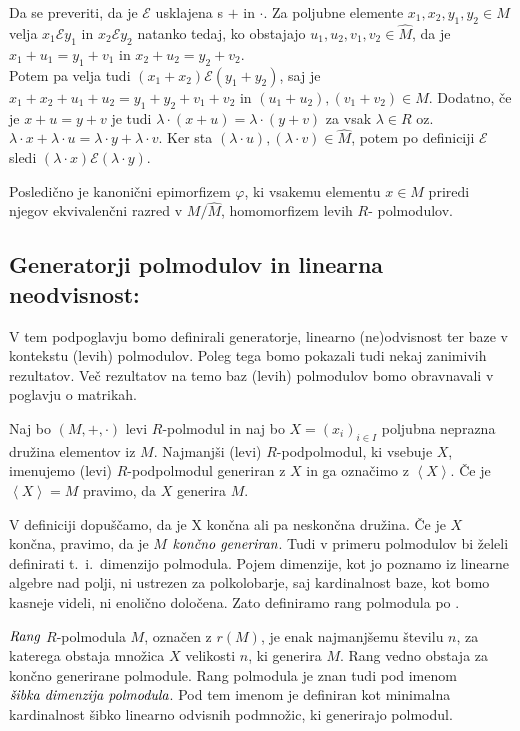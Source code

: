 \documentclass[mat1]{fmfdelo}
\newcommand{\pojem}[1]{\ensuremath{\emph{#1}}}
\newcommand{\Gen}[1]{\ensuremath{\left<{#1}\right>}}
\begin{document}
Da se preveriti, da je $\mathcal{E}$ usklajena s $+$ in $\cdot$. Za poljubne elemente $x_1, x_2, y_1, y_2 \in M$ velja $x_1\mathcal{E}y_1$ in $x_2\mathcal{E}y_2$ natanko tedaj, ko obstajajo $u_1, u_2, v_1, v_2 \in \widehat{M}$, da je $x_1 + u_1 = y_1 + v_1$ in $ x_2 + u_2 = y_2 + v_2$. \\

Potem pa velja tudi $(x_1 + x_2)\mathcal{E}(y_1 + y_2)$, saj je $x_1 + x_2 + u_1 + u_2 = y_1 + y_2 + v_1 + v_2$ in $(u_1 + u_2), (v_1 + v_2)\in \widehat{M}$. Dodatno, če je $x + u = y + v$ je tudi $\lambda\cdot (x + u) = \lambda\cdot (y + v)$ za vsak $\lambda\in R$ oz. $\lambda\cdot x + \lambda\cdot u = \lambda\cdot y + \lambda\cdot v$. Ker sta $(\lambda\cdot u), (\lambda\cdot v)\in \widehat{M}$, potem po definiciji $\mathcal{E}$ sledi $(\lambda\cdot x) \mathcal{E} (\lambda\cdot y)$.

Posledično je kanonični epimorfizem $\varphi$, ki vsakemu elementu $x\in M$ priredi njegov ekvivalenčni razred v $M/\widehat{M}$, homomorfizem levih $R$- polmodulov.

\subsection{Generatorji polmodulov in linearna neodvisnost:} \label{subsect:base}
V tem podpoglavju bomo definirali generatorje, linearno (ne)odvisnost ter baze v kontekstu (levih) polmodulov. Poleg tega bomo pokazali tudi nekaj zanimivih rezultatov. Več rezultatov na temo baz (levih) polmodulov bomo obravnavali v poglavju o matrikah.
\begin{definicija}
	Naj bo $(M, +, \cdot)$ levi $R$-polmodul in naj bo $X = (x_i)_{i\in I}$ poljubna neprazna družina elementov iz $M$. Najmanjši (levi) $R$-podpolmodul, ki vsebuje $X$, imenujemo (levi) $R$-podpolmodul generiran z $X$ in ga označimo z \Gen{X}. Če je $\Gen{X} = M$ pravimo, da $X$ generira $M$.
\end{definicija}

	V definiciji dopuščamo, da je X končna ali pa neskončna družina. Če je $X$ končna, pravimo, da je $M$ \pojem{končno generiran}. Tudi v primeru polmodulov bi želeli definirati t.~i.\ dimenzijo polmodula. Pojem dimenzije, kot jo poznamo iz linearne algebre nad polji, ni ustrezen za polkolobarje, saj kardinalnost baze, kot bomo kasneje videli, ni enolično določena. Zato definiramo rang polmodula po \cite[str. 3--4]{bib:Tanbase}.

\begin{definicija}
	\pojem{Rang} $R$-polmodula $M$, označen z $r(M)$, je enak najmanjšemu številu $n$, za katerega obstaja množica $X$ velikosti $n$, ki generira $M$. Rang vedno obstaja za končno generirane polmodule. Rang polmodula je znan tudi pod imenom \pojem{šibka dimenzija polmodula}. Pod tem imenom je definiran kot minimalna kardinalnost šibko linearno odvisnih podmnožic, ki generirajo polmodul.
\end{definicija}
\end{document}
